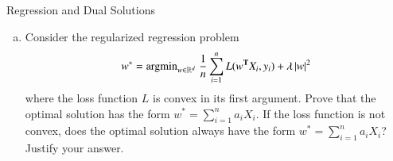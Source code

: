 \documentclass[section]{problemset}
\newcommand{\argmin}{\mathrm{argmin}}
\begin{document}
\begin{problem} {Regression and Dual Solutions}
\begin{enumerate}[a)]
Show that the optimum $w^*$ is unique.
By setting the gradient of the objective function to zero,
show that $w^*$ can be written as
a linear combination $w^* = \sum_{i=1}^n a_i X_i$ for some scalars
$a_1, \ldots, a_n$.
Write the vector $a$ of dual coefficients in terms of $X$, $y$, and
the optimal solution $w^*$.

\item Consider the regularized regression problem
\[
w^* = \argmin_{w \in \R^d} \; \frac{1}{n} \sum_{i=1}^n L(w^{\T} X_i, y_i) + \lambda \, |w|^2
\]
where the loss function $L$ is convex in its first argument.
Prove that the optimal solution has the form $w^* = \sum_{i=1}^n a_i X_i$.
If the loss function is not convex, does the optimal solution always have
the form $w^* = \sum_{i=1}^n a_i X_i$?
Justify your answer.
\end{enumerate}
\end{problem}


\newpage
\end{document}
